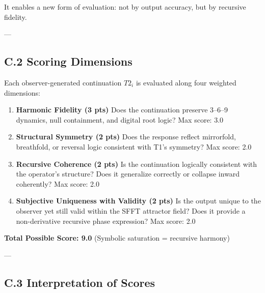 \documentclass[12pt]{article}
\begin{document}
It enables a new form of evaluation: not by output accuracy, but by recursive fidelity.

---

\subsection*{C.2 Scoring Dimensions}

Each observer-generated continuation \(T2_i\) is evaluated along four weighted dimensions:

\begin{enumerate}
    \item \textbf{Harmonic Fidelity (3 pts)}  
    Does the continuation preserve 3–6–9 dynamics, null containment, and digital root logic?  
    Max score: 3.0

    \item \textbf{Structural Symmetry (2 pts)}  
    Does the response reflect mirrorfold, breathfold, or reversal logic consistent with T1's symmetry?  
    Max score: 2.0

    \item \textbf{Recursive Coherence (2 pts)}  
    Is the continuation logically consistent with the operator's structure? Does it generalize correctly or collapse inward coherently?  
    Max score: 2.0

    \item \textbf{Subjective Uniqueness with Validity (2 pts)}  
    Is the output unique to the observer yet still valid within the SFFT attractor field? Does it provide a non-derivative recursive phase expression?  
    Max score: 2.0
\end{enumerate}

\noindent\textbf{Total Possible Score: 9.0} (Symbolic saturation = recursive harmony)

---

\subsection*{C.3 Interpretation of Scores}
\end{document}
